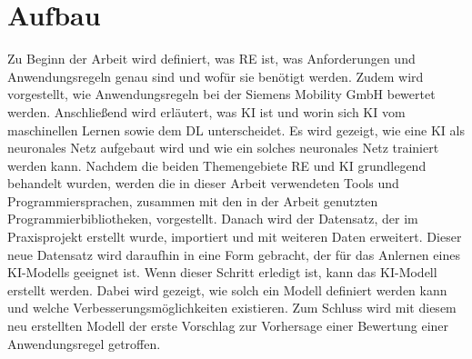 \section{Aufbau}
Zu Beginn der Arbeit wird definiert, was \ac{RE} ist, was Anforderungen und Anwendungsregeln genau sind und wofür sie benötigt werden. Zudem wird vorgestellt,
wie Anwendungsregeln bei der Siemens Mobility GmbH bewertet werden. Anschließend wird erläutert, was \ac{KI} ist und worin sich \ac{KI} vom maschinellen Lernen sowie dem \ac{DL}
unterscheidet. Es wird gezeigt, wie eine \ac{KI} als neuronales Netz aufgebaut wird und wie ein solches neuronales Netz trainiert werden kann. 
Nachdem die beiden Themengebiete \ac{RE} und \ac{KI} grundlegend behandelt wurden, werden die in dieser Arbeit verwendeten Tools und Programmiersprachen,
zusammen mit den in der Arbeit genutzten Programmierbibliotheken, vorgestellt. Danach wird der Datensatz, der im Praxisprojekt erstellt wurde, importiert
und mit weiteren Daten erweitert. Dieser neue Datensatz wird daraufhin in eine Form gebracht, der für das Anlernen eines \ac{KI}-Modells geeignet ist.
Wenn dieser Schritt erledigt ist, kann das \ac{KI}-Modell erstellt werden. Dabei wird gezeigt, wie solch ein Modell definiert werden kann und welche 
Verbesserungsmöglichkeiten existieren. Zum Schluss wird mit diesem neu erstellten Modell der erste Vorschlag zur Vorhersage einer Bewertung einer Anwendungsregel getroffen.
